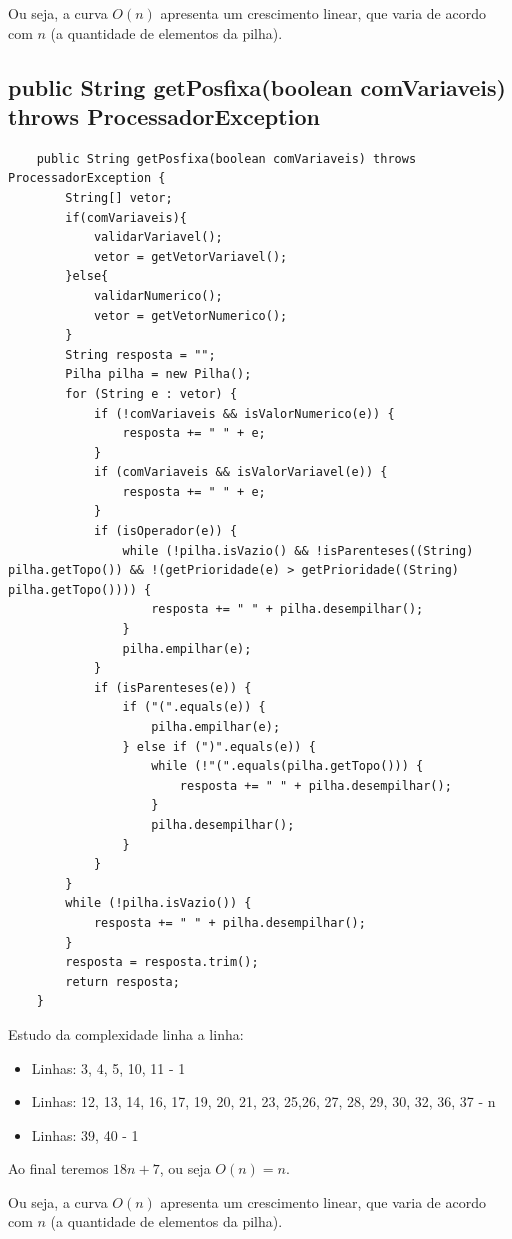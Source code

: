\documentclass[a4paper,11pt]{article}
\begin{document}
Ou seja, a curva $O(n)$ apresenta um crescimento linear, que varia de acordo com $n$ (a quantidade de elementos da pilha).

\subsection{public String getPosfixa(boolean comVariaveis) throws ProcessadorException}
\begin{lstlisting}
    public String getPosfixa(boolean comVariaveis) throws ProcessadorException {        
        String[] vetor;       
        if(comVariaveis){
            validarVariavel();
            vetor = getVetorVariavel();
        }else{
            validarNumerico();
            vetor = getVetorNumerico();
        }       
        String resposta = "";
        Pilha pilha = new Pilha();       
        for (String e : vetor) {
            if (!comVariaveis && isValorNumerico(e)) {
                resposta += " " + e;
            }          
            if (comVariaveis && isValorVariavel(e)) {
                resposta += " " + e;
            }
            if (isOperador(e)) {
                while (!pilha.isVazio() && !isParenteses((String) pilha.getTopo()) && !(getPrioridade(e) > getPrioridade((String) pilha.getTopo()))) {
                    resposta += " " + pilha.desempilhar();
                }
                pilha.empilhar(e);
            }
            if (isParenteses(e)) {
                if ("(".equals(e)) {
                    pilha.empilhar(e);
                } else if (")".equals(e)) {
                    while (!"(".equals(pilha.getTopo())) {
                        resposta += " " + pilha.desempilhar();
                    }
                    pilha.desempilhar();
                }
            }
        }
        while (!pilha.isVazio()) {
            resposta += " " + pilha.desempilhar();
        }      
        resposta = resposta.trim();
        return resposta;
    }
\end{lstlisting}

Estudo da complexidade linha a linha:
\begin{itemize}
  \item Linhas:  3, 4, 5, 10, 11 - 1
  \item Linhas: 12, 13, 14, 16, 17, 19, 20, 21, 23, 25,26, 27, 28, 29, 30, 32,
  36, 37 - n
  \item Linhas: 39, 40 - 1
\end{itemize}
Ao final teremos \(18n+7\), ou seja \(O(n)=n\).

Ou seja, a curva $O(n)$ apresenta um crescimento linear, que varia de acordo com $n$ (a quantidade de elementos da pilha).
\end{document}
